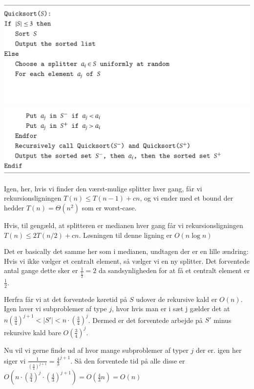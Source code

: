 \documentclass[11pt]{article}
\theoremstyle{definition}
\theoremstyle{remark}
\begin{document}
\includegraphics[width=400pt]{main--randomized-algorithms--quicksort-87e6.png}
\includegraphics[width=400pt]{main--randomized-algorithms--quicksort-3a99.png}

Igen, her, hvis vi finder den værst-mulige splitter hver gang, får vi rekursionsligningen $T(n) \leq T(n-1) + cn$, og vi ender med et bound der hedder $T(n) = \Theta(n^{2})$ som er worst-case.


Hvis, til gengæld, at splitteren er medianen hver gang får vi rekursionsligningen $T(n) \leq 2T(n/2) + cn$. Løsningen til denne ligning er $O(n \log n)$

Det er basically det samme her som i medianen, undtagen der er en lille ændring: Hvis vi ikke vælger et centralt element, så vælger vi en ny splitter. Det forventede antal gange dette sker er $\frac{1}{\frac{1}{2}} = 2$  da sandsynligheden for at få et centralt element er $\frac{1}{2}$.


Herfra får vi at det forventede køretid på $S$ udover de rekursive kald er $O(n)$.
Igen laver vi subproblemer af type $j$, hvor hvis man er i sæt j gælder det at $n \left(  \frac{3}{4} \right)^{j+1} < |S'| < n \cdot \left( \frac{3}{4} \right)^{j}$. Dermed er det forventede arbejde på $S'$ minus rekursive kald bare $O \left( \frac{3}{4} \right)^{j}$.

Nu vil vi gerne finde ud af hvor mange subproblemer af typer $j$ der er. igen her siger vi $\frac{1}{\left( \frac{3}{4} \right)^{j+1}} = \frac{4}{3}^{j+1}$. Så den forventede tid på alle disse er $O(n \cdot \left( \frac{3}{4} \right)^{j}  \cdot \left( \frac{4}{3} \right)^{j+1}) = O(\frac{4}{3}n) = O(n) $
\end{document}
